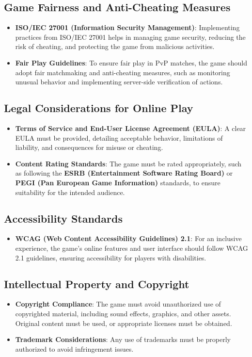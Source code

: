 \subsection{Game Fairness and Anti-Cheating Measures}
\begin{itemize}
    \item \textbf{ISO/IEC 27001 (Information Security Management)}: Implementing practices from ISO/IEC 27001 helps in managing game security, reducing the risk of cheating, and protecting the game from malicious activities.
    \item \textbf{Fair Play Guidelines}: To ensure fair play in PvP matches, the game should adopt fair matchmaking and anti-cheating measures, such as monitoring unusual behavior and implementing server-side verification of actions.
\end{itemize}

\subsection{Legal Considerations for Online Play}
\begin{itemize}
    \item \textbf{Terms of Service and End-User License Agreement (EULA)}: A clear EULA must be provided, detailing acceptable behavior, limitations of liability, and consequences for misuse or cheating.
    \item \textbf{Content Rating Standards}: The game must be rated appropriately, such as following the \textbf{ESRB (Entertainment Software Rating Board)} or \textbf{PEGI (Pan European Game Information)} standards, to ensure suitability for the intended audience.
\end{itemize}

\subsection{Accessibility Standards}
\begin{itemize}
    \item \textbf{WCAG (Web Content Accessibility Guidelines) 2.1}: For an inclusive experience, the game’s online features and user interface should follow WCAG 2.1 guidelines, ensuring accessibility for players with disabilities.
\end{itemize}

\subsection{Intellectual Property and Copyright}
\begin{itemize}
    \item \textbf{Copyright Compliance}: The game must avoid unauthorized use of copyrighted material, including sound effects, graphics, and other assets. Original content must be used, or appropriate licenses must be obtained.
    \item \textbf{Trademark Considerations}: Any use of trademarks must be properly authorized to avoid infringement issues.
\end{itemize}

